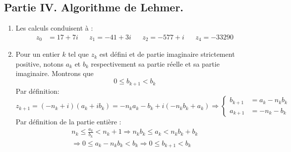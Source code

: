 \subsection*{Partie IV. Algorithme de Lehmer.}
\begin{enumerate}
 \item Les calculs conduisent à :
\begin{align*}
 z_0&= 17+7i & & z_1=-41+3i & & z_2=-577+i & & z_4=-33290
\end{align*}
\item Pour un entier $k$  tel que $z_k$ est défini et de partie imaginaire strictement positive, notons $a_k$ et $b_k$ respectivement sa partie réelle et sa partie imaginaire. Montrons que 
\begin{displaymath}
 0\leq b_{k+1} < b_{k} 
\end{displaymath}
Par définition:
\begin{displaymath}
 z_{k+1}=(-n_k +i)(a_k +ib_k)
=-n_ka_k-b_k +i(-n_kb_k+a_k)
\Rightarrow
\left\lbrace 
\begin{aligned}
b_{k+1} &= a_k-n_kb_k \\
a_{k+1} &= -n_k-b_k
\end{aligned}
\right. 
\end{displaymath}
Par définition de la partie entière :
\begin{multline*}
 n_k\leq \frac{a_k}{b_k} <n_k +1 
\Rightarrow n_kb_k\leq a_k <n_kb_k + b_k \\
\Rightarrow 0 \leq a_k -n_kb_k<b_k
\Rightarrow 0\leq b_{k+1} <b_k
\end{multline*}


\end{enumerate}
